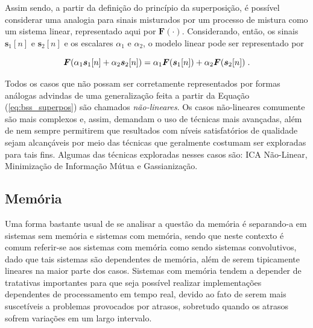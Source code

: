 Assim sendo, a partir da definição do princípio da superposição, é possível considerar uma analogia para sinais misturados por um processo de mistura como um sistema linear, representado aqui por $\bm{F}(\cdot)$. Considerando, então, os sinais $\bm{s}_{1}[n]$ e $\bm{s}_{2}[n]$ e os escalares $\alpha_{1}$ e $\alpha_{2}$, o modelo linear pode ser representado por

\begin{equation}
    \bm{F}(\alpha_{1} \bm{s}_{1}[n] + \alpha_{2} \bm{s}_{2}[n]) = \alpha_{1} \bm{F}(\bm{s}_{1}[n]) + \alpha_{2} \bm{F}(\bm{s}_{2}[n])
    \hspace{0.1cm}.
    \vspace{0.2cm}
    \label{eq:bss_superpos}
\end{equation}

\noindent Todos os casos que não possam ser corretamente representados por formas análogas advindas de uma generalização feita a partir da Equação (\ref{eq:bss_superpos}) são chamados \textit{não-lineares}. Os casos não-lineares comumente são mais complexos e, assim, demandam o uso de técnicas mais avançadas, além de nem sempre permitirem que resultados com níveis satisfatórios de qualidade sejam alcançáveis por meio das técnicas que geralmente costumam ser exploradas para tais fins. Algumas das técnicas exploradas nesses casos são: ICA Não-Linear, Minimização de Informação Mútua e Gassianização.



\subsection{Memória}
\label{subsec:bss_memory}

Uma forma bastante usual de se analisar a questão da memória é separando-a em sistemas sem memória e sistemas com memória, sendo que neste contexto é comum referir-se aos sistemas com memória como sendo sistemas convolutivos, dado que tais sistemas são dependentes de memória, além de serem tipicamente lineares na maior parte dos casos. Sistemas com memória tendem a depender de tratativas importantes para que seja possível realizar implementações dependentes de processamento em tempo real, devido ao fato de serem mais suscetíveis a problemas provocados por atrasos, sobretudo quando os atrasos sofrem variações em um largo intervalo.\\

